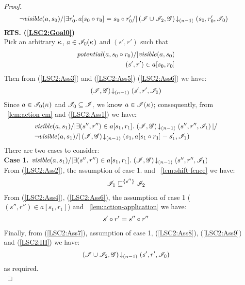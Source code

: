 \begin{lemma}
\begin{proof}
\begin{align}
%  
  &\ \neg\m{visible}(a, s_0) /| \exsts{r'_0} a[s_0 \composeL r_0] = s_0 \composeL r'_0 /| \extendsAMUpto{\lmod \cup \lmod_2, \gmod}{(n-1)}{s_0}{r'_0}{\lmod_0}  \label{LSC2:Goal3}
\end{align}
%
\noindent\textbf{RTS. (\ref{LSC2:Goal0})} \\
Pick an arbitrary $\kappa_{}$, $a \in \mathscr{I}_0(\kappa_{})$ and $(s', r')$ such that
%
\begin{align}
	\mathit{potential}(a, s_0 \circ r_0) /| \mathit{visible}(a, s_0) \label{LSC2:Ass5}\\
	(s', r') \in a[s_0, r_0] \label{LSC2:Ass6}
\end{align}
Then from (\ref{LSC2:Ass3}) and (\ref{LSC2:Ass5})-(\ref{LSC2:Ass6}) we have:
%
\begin{align}
	\left(\mathscr{I}, \mathscr{G}\right) \!\downarrow_{(n-1)} \left(s', r', \mathscr{I}_0\right) \label{LSC2:Ass7}
\end{align}
%
Since $a \in \mathscr{I}_0(\kappa_{})$ and $\mathscr{I}_0 \subseteq \mathscr{I}$, we know $a \in \mathscr{I}(\kappa_{})$; consequently, from \lem~\ref{lem:action-em} and (\ref{LSC2:Ass1}) we have: 
%
\begin{align*}
	&	\mathit{visible}(a, s_1) /| \exists (s'', r'') \in a[s_1, r_1].\, \left(\mathscr{I}, \mathscr{G}\right) \!\downarrow_{(n-1)} \left(s'', r'', \mathscr{I}_1\right) |/ \\
	& \neg\mathit{visible}(a, s_1) /| \left(\mathscr{I}, \mathscr{G}\right) \!\downarrow_{(n-1)} \left(s_1, a[s_1 \circ r_1] - s_1', \mathscr{I}_1\right)
\end{align*}
There are two cases to consider:\\

\noindent\textbf{Case 1. }
$\mathit{visible}(a, s_1) /| \exists (s'', r'') \in a[s_1, r_1].\, \left(\mathscr{I}, \mathscr{G}\right) \!\downarrow_{(n-1)} \left(s'', r'', \mathscr{I}_1\right)$\\
From (\ref{LSC2:Ass2}), the assumption of case 1. and \lem~\ref{lem:shift-fence} we have:
%
\begin{align}
	\mathscr{I}_1 \sqsubseteq^{\{s''\}} \mathscr{I}_2 \label{LSC2:Ass8}
\end{align}
%
From (\ref{LSC2:Ass4}), (\ref{LSC2:Ass6}), the assumption of case 1 ($(s'', r'') \in a[s_1, r_1]$) and \lem~\ref{lem:action-application} we have:
%
\begin{align}
	s' \circ r' = s'' \circ r'' \label{LSC2:Ass9}
\end{align}
%
Finally, from (\ref{LSC2:Ass7}), assumption of case 1, (\ref{LSC2:Ass8}), (\ref{LSC2:Ass9}) and (\ref{LSC2:IH}) we have: 
%
\begin{align*}
	\left(\mathscr{I} \cup \mathscr{I}_2, \mathscr{G}\right) \!\downarrow_{(n-1)} \left(s', r', \mathscr{I}_0\right)
\end{align*}
%
as required.\\


\end{proof}
\end{lemma}
